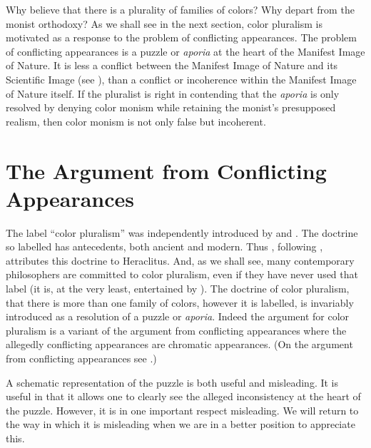 \documentclass[12pt]{article}
\begin{document}
Why believe that there is a plurality of families of colors? Why depart from the monist orthodoxy? As we shall see in the next section, color pluralism is motivated as a response to the problem of conflicting appearances. The problem of conflicting appearances is a puzzle or \emph{aporia} at the heart of the Manifest Image of Nature. It is less a conflict between the Manifest Image of Nature and its Scientific Image (see \citealt{Sellars:1963eo}), than a conflict or incoherence within the Manifest Image of Nature itself. If the pluralist is right in contending that the \emph{aporia} is only resolved by denying color monism while retaining the monist's presupposed realism, then color monism is not only false but incoherent.


\section{The Argument from Conflicting Appearances} %
\label{sec:the_argument_from_conflicting_appearances}

The label ``color pluralism'' was independently introduced by \citet{Mizrahi:2006zr} and \citet{Kalderon:2006tg}. The doctrine so labelled has antecedents, both ancient and modern. Thus \citet{Kalderon:2006tg}, following \citet{Burnyeat:1979mv}, attributes this doctrine to Heraclitus. And, as we shall see, many contemporary philosophers are committed to color pluralism, even if they have never used that label (it is, at the very least, entertained by \citealt{Harman:2001mv}). The doctrine of color pluralism, that there is more than one family of colors, however it is labelled, is invariably introduced as a resolution of a puzzle or \emph{aporia}. Indeed the argument for color pluralism is a variant of the argument from conflicting appearances where the allegedly conflicting appearances are chromatic appearances. (On the argument from conflicting appearances see \citealt{Burnyeat:1979mv,Annas:1985fk}.)

A schematic representation of the puzzle is both useful and misleading. It is useful in that it allows one to clearly see the alleged inconsistency at the heart of the puzzle. However, it is in one important respect misleading. We will return to the way in which it is misleading when we are in a better position to appreciate this.
\end{document}
